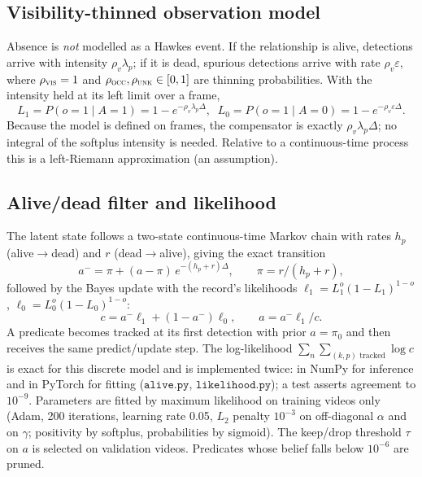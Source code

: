 \documentclass[conference]{IEEEtran}
\newcommand{\VIS}{\textsc{vis}}
\newcommand{\OCC}{\textsc{occ}}
\newcommand{\UNK}{\textsc{unk}}
\begin{document}
\subsection{Visibility-thinned observation model}
Absence is \emph{not} modelled as a Hawkes event. If the relationship is alive,
detections arrive with intensity $\rho_v\lambda_p$; if it is dead, spurious detections
arrive with rate $\rho_v\varepsilon$, where $\rho_{\VIS}=1$ and
$\rho_{\OCC},\rho_{\UNK}\in[0,1]$ are thinning probabilities. With the intensity held
at its left limit over a frame,
\begin{equation}
L_1\!=\!P(o\!=\!1\mid A\!=\!1)=1-e^{-\rho_v\lambda_p\Delta},\;\;
L_0\!=\!P(o\!=\!1\mid A\!=\!0)=1-e^{-\rho_v\varepsilon\Delta}.
\label{eq:emission}
\end{equation}
Because the model is defined on frames, the compensator is exactly
$\rho_v\lambda_p\Delta$; no integral of the softplus intensity is needed. Relative to a
continuous-time process this is a left-Riemann approximation (an assumption).

\subsection{Alive/dead filter and likelihood}
The latent state follows a two-state continuous-time Markov chain with rates $h_p$
(alive$\to$dead) and $r$ (dead$\to$alive), giving the exact transition
\begin{equation}
a^- = \pi + (a-\pi)\,e^{-(h_p+r)\Delta},\qquad \pi=r/(h_p+r),
\label{eq:predict}
\end{equation}
followed by the Bayes update with the record's likelihoods
$\ell_1=L_1^{o}(1-L_1)^{1-o}$, $\ell_0=L_0^{o}(1-L_0)^{1-o}$:
\begin{equation}
c=a^-\ell_1+(1-a^-)\ell_0,\qquad a = a^-\ell_1/c.
\label{eq:update}
\end{equation}
A predicate becomes tracked at its first detection with prior $a=\pi_0$ and then
receives the same predict/update step. The log-likelihood
$\sum_n\sum_{(k,p)\text{ tracked}}\log c$ is exact for this discrete model and is
implemented twice: in NumPy for inference and in PyTorch for fitting
($\texttt{alive.py}$, $\texttt{likelihood.py}$); a test asserts agreement to
$10^{-9}$. Parameters are fitted by maximum likelihood on training videos only
(Adam, 200 iterations, learning rate 0.05, $L_2$ penalty $10^{-3}$ on off-diagonal
$\alpha$ and on $\gamma$; positivity by softplus, probabilities by sigmoid). The
keep/drop threshold $\tau$ on $a$ is selected on validation videos. Predicates whose
belief falls below $10^{-6}$ are pruned.
\end{document}
